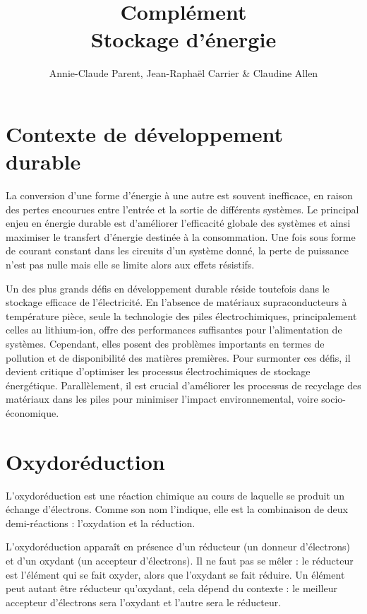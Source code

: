 \documentclass[12pt,oneside,letterpaper]{article}
\begin{document}
\title{\textbf{Complément}\\Stockage d'énergie}
\author{Annie-Claude Parent, Jean-Raphaël Carrier \& Claudine Allen}
\date{}
\maketitle

\section{Contexte de développement durable}

La conversion d'une forme d'énergie à une autre est souvent inefficace, en raison des pertes encourues entre l'entrée et la sortie de différents systèmes. Le principal enjeu en énergie durable est d'améliorer l'efficacité globale des systèmes et ainsi maximiser le transfert d'énergie destinée à la consommation. Une fois sous forme de courant constant dans les circuits d'un système donné, la perte de puissance n'est pas nulle mais elle se limite alors aux effets résistifs.

Un des plus grands défis en développement durable réside toutefois dans le stockage efficace de l'électricité. En l'absence de matériaux supraconducteurs à température pièce, seule la technologie des piles électrochimiques, principalement celles au lithium-ion, offre des performances suffisantes pour l'alimentation de systèmes. Cependant, elles posent des problèmes importants en termes de pollution et de disponibilité des matières premières. Pour surmonter ces défis, il devient critique d'optimiser les processus électrochimiques de stockage énergétique. Parallèlement, il est crucial d'améliorer les processus de recyclage des matériaux dans les piles pour minimiser l'impact environnemental, voire socio-économique.



\section{Oxydoréduction}

L'oxydoréduction est une réaction chimique au cours de laquelle se produit un échange d'électrons. Comme son nom l'indique, elle est la combinaison de deux demi-réactions : l'oxydation et la réduction.

L'oxydoréduction apparaît en présence d'un réducteur (un donneur d'électrons) et d'un oxydant (un accepteur d'électrons). Il ne faut pas se mêler : le réducteur est l'élément qui se fait oxyder, alors que l'oxydant se fait réduire. Un élément peut autant être réducteur qu'oxydant, cela dépend du contexte : le meilleur accepteur d'électrons sera l'oxydant et l'autre sera le réducteur.
\end{document}
